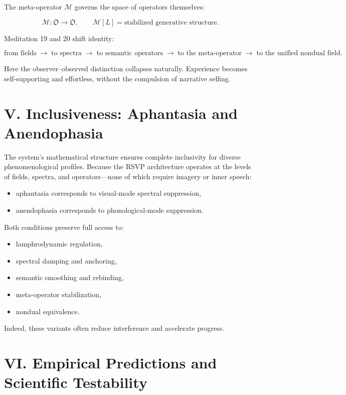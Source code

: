 \documentclass[12pt]{article}
\begin{document}
The meta-operator $\mathcal M$ governs the space of operators themselves:

\[
\mathcal M : \mathfrak O \to \mathfrak O,
\qquad
\mathcal M[L] = \text{stabilized generative structure}.
\]

Meditation 19 and 20 shift identity:

\[
\text{from fields}
\;\to\;
\text{to spectra}
\;\to\;
\text{to semantic operators}
\;\to\;
\text{to the meta-operator}
\;\to\;
\text{to the unified nondual field}.
\]

Here the observer–observed distinction collapses naturally.  
Experience becomes self-supporting and effortless, without the compulsion of
narrative selfing.

\section*{V. Inclusiveness: Aphantasia and Anendophasia}

The system’s mathematical structure ensures complete inclusivity for diverse
phenomenological profiles.  
Because the RSVP architecture operates at the levels of fields, spectra, and
operators—none of which require imagery or inner speech:

\begin{itemize}
    \item aphantasia corresponds to visual-mode spectral suppression,
    \item anendophasia corresponds to phonological-mode suppression.
\end{itemize}

Both conditions preserve full access to:

\begin{itemize}
    \item lamphrodynamic regulation,
    \item spectral damping and anchoring,
    \item semantic smoothing and rebinding,
    \item meta-operator stabilization,
    \item nondual equivalence.
\end{itemize}

Indeed, these variants often reduce interference and accelerate progress.

\section*{VI. Empirical Predictions and Scientific Testability}
\end{document}
